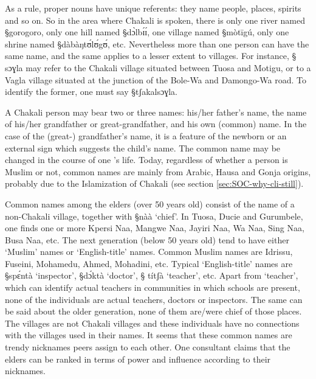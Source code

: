 
As a rule,   proper nouns
have  unique referents:  they  name people, places, spirits and so on.  So in
the
area where Chakali is spoken, there is only one river named {\S gorogoro}, only
one hill named {\S dɔ̀lbɪ́ɪ́}, one
village
named {\S mòtīgú},  only one shrine named {\S dàbàŋtʊ́lʊ́gʊ́}, etc.  
Nevertheless more than one person can have the same
name, and the same applies to a lesser extent to villages. For instance,
{\S
sɔɣla} may refer to the Chakali village situated between Tuosa and Motigu, or to
a Vagla village situated at the junction of the Bole-Wa and Damongo-Wa road. To
identify the former, one must say {\S tʃakalsɔɣla}. 


A  Chakali person may bear two or three names: his/her father's name, the name
of his/her grandfather or great-grandfather, and his own (common) name. In the
case of the (great-) grandfather's name, it is a feature of the newborn or an
external sign which suggests the child's name.  The common name may be changed
in
the course of one 's life. Today, regardless of whether a  person is Muslim or
not,
common names are mainly from Arabic, Hausa and Gonja origins, probably due to
the
Islamization of Chakali (see section \ref{sec:SOC-why-cli-still}).


Common names among the  elders (over 50 years old) consist of the name of a
non-Chakali village,  together with {\S nàà} `chief'. In Tuosa, Ducie and
Gurumbele, one finds one or more Kpersi Naa, Mangwe Naa, Jayiri Naa, Wa Naa, 
Sing Naa,  Busa Naa, etc. The next generation (below 50 years old) tend to
have either `Muslim' names or `English-title' names. Common Muslim names are
Idrissu, Fuseini, Mohamedu, Ahmed, Mohadini, etc.  Typical 
`English-title' names are {\S spɛ́ntà} `inspector',  {\S dɔ́ktà} `doctor', {\S
títʃà} `teacher', etc. Apart from `teacher',  which can identify actual
teachers in communities in which schools are present, none of the individuals
are actual teachers, doctors or inspectors. The same can be said about the older
generation, none of them are/were chief of those places. The villages are not
Chakali villages and these individuals have no connections with the villages
used in their names. It seems that these common names are trendy  nicknames
peers  assign to each other. One consultant claims that the elders can be
ranked in terms of power and influence according to their nicknames. 

